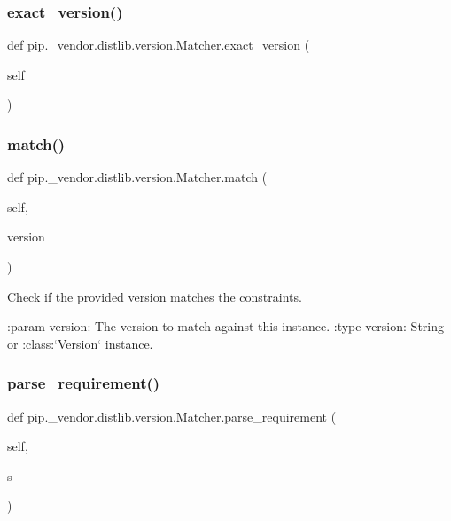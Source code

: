 \subsubsection{\texorpdfstring{exact\+\_\+version()}{exact\_version()}}
{\footnotesize\ttfamily def pip.\+\_\+vendor.\+distlib.\+version.\+Matcher.\+exact\+\_\+version (\begin{DoxyParamCaption}\item[{}]{self }\end{DoxyParamCaption})}

\mbox{\label{classpip_1_1__vendor_1_1distlib_1_1version_1_1Matcher_abab07ac81cd23c3863693a3986eca843}} 
\subsubsection{\texorpdfstring{match()}{match()}}
{\footnotesize\ttfamily def pip.\+\_\+vendor.\+distlib.\+version.\+Matcher.\+match (\begin{DoxyParamCaption}\item[{}]{self,  }\item[{}]{version }\end{DoxyParamCaption})}

\begin{DoxyVerb}Check if the provided version matches the constraints.

:param version: The version to match against this instance.
:type version: String or :class:`Version` instance.
\end{DoxyVerb}
 \mbox{\label{classpip_1_1__vendor_1_1distlib_1_1version_1_1Matcher_a742c0bfda9e1c70369b7d4c5fd9d1e66}} 
\subsubsection{\texorpdfstring{parse\+\_\+requirement()}{parse\_requirement()}}
{\footnotesize\ttfamily def pip.\+\_\+vendor.\+distlib.\+version.\+Matcher.\+parse\+\_\+requirement (\begin{DoxyParamCaption}\item[{}]{self,  }\item[{}]{s }\end{DoxyParamCaption})}



